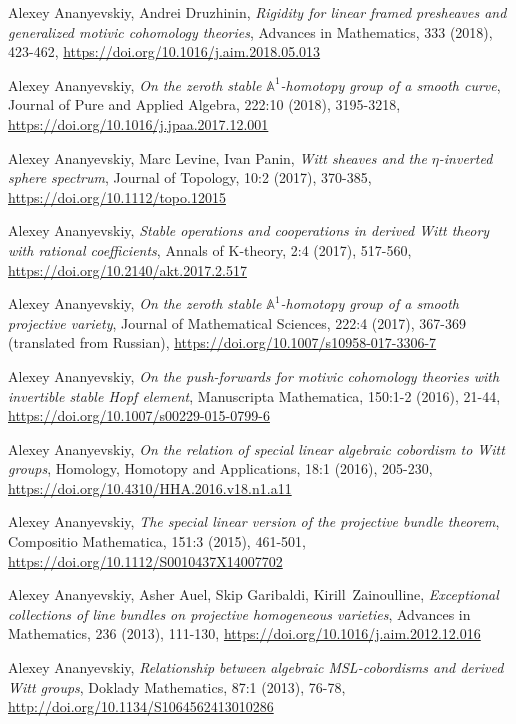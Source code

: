 \documentclass[11pt,a4paper,sans]{moderncv}
\begin{document}
\begin{etaremune}[leftmargin=20pt]
	\item	
	Alexey Ananyevskiy, Andrei Druzhinin, \emph{Rigidity for linear framed presheaves and generalized motivic cohomology theories}, Advances in Mathematics, 333 (2018), 423-462, \url{https://doi.org/10.1016/j.aim.2018.05.013}
	\item
	Alexey Ananyevskiy, \emph{On the zeroth stable $\mathbb{A}^1$-homotopy group of a smooth curve}, Journal of Pure and Applied Algebra, 222:10 (2018), 3195-3218, \url{https://doi.org/10.1016/j.jpaa.2017.12.001}
	\item	
	Alexey Ananyevskiy, Marc Levine, Ivan Panin, \emph{Witt sheaves and the $\eta$-inverted sphere spectrum}, Journal of Topology, 10:2 (2017), 370-385, \url{https://doi.org/10.1112/topo.12015}
	\item	
	Alexey Ananyevskiy, \emph{Stable operations and cooperations in derived Witt theory with rational coefficients}, Annals of K-theory, 2:4 (2017), 517-560, \url{https://doi.org/10.2140/akt.2017.2.517}
	\item
	Alexey Ananyevskiy, \emph{On the zeroth stable $\mathbb{A}^1$-homotopy group of a smooth projective variety}, Journal of Mathematical Sciences, 222:4 (2017), 367-369 (translated from Russian), \url{https://doi.org/10.1007/s10958-017-3306-7}
	\item	
	Alexey Ananyevskiy, \emph{On the push-forwards for motivic cohomology theories with invertible stable Hopf element}, Manuscripta Mathematica, 150:1-2 (2016), 21-44, \url{https://doi.org/10.1007/s00229-015-0799-6}
	\item
	Alexey Ananyevskiy, \emph{On the relation of special linear algebraic cobordism to Witt groups}, Homology, Homotopy and Applications, 18:1 (2016), 205-230, \url{https://doi.org/10.4310/HHA.2016.v18.n1.a11}
	\item
	Alexey Ananyevskiy, \emph{The special linear version of the projective bundle theorem}, Compositio Mathematica, 151:3 (2015), 461-501, \url{https://doi.org/10.1112/S0010437X14007702}
	\item
	Alexey Ananyevskiy, Asher Auel, Skip Garibaldi, Kirill~Zainoulline, \emph{Exceptional collections of line bundles on projective homogeneous varieties}, Advances in Mathematics, 236 (2013), 111-130, \url{https://doi.org/10.1016/j.aim.2012.12.016}
	\item
	Alexey Ananyevskiy, \emph{Relationship between algebraic MSL-cobordisms and derived Witt groups}, Doklady Mathematics, 87:1 (2013), 76-78, \url{http://doi.org/10.1134/S1064562413010286}
	\item

\end{etaremune}
\end{document}
